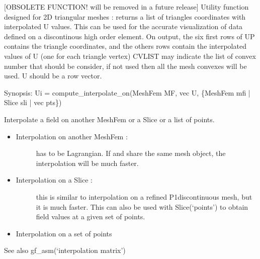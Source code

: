 \documentclass[a4paper,11pt,english]{sphinxmanual}
\begin{document}
\begin{fulllineitems}
\label{\detokenize{python/cmdref_Module compute:getfem.compute_eval_on_triangulated_surface}}
{[}OBSOLETE FUNCTION! will be removed in a future release{]}
Utility function designed for 2D triangular meshes : returns a list
of triangles coordinates with interpolated U values. This can be
used for the accurate visualization of data defined on a
discontinous high order element. On output, the six first rows of UP
contains the triangle coordinates, and the others rows contain the
interpolated values of U (one for each triangle vertex) CVLIST may
indicate the list of convex number that should be consider, if not
used then all the mesh convexes will be used. U should be a row
vector.

\end{fulllineitems}


\begin{fulllineitems}
\label{\detokenize{python/cmdref_Module compute:getfem.compute_interpolate_on}}
Synopsis: Ui = compute\_interpolate\_on(MeshFem MF, vec U, \{MeshFem mfi | Slice sli | vec pts\})

Interpolate a field on another MeshFem or a Slice or a list of points.
\begin{itemize}
\item {} \begin{description}
\item[{Interpolation on another MeshFem :}] \leavevmode
{} has to be Lagrangian. If  and  share the same
mesh object, the interpolation will be much faster.

\end{description}

\item {} \begin{description}
\item[{Interpolation on a Slice :}] \leavevmode
this is similar to interpolation on a refined P1\sphinxhyphen{}discontinuous
mesh, but it is much faster. This can also be used with
Slice(‘points’) to obtain field values at a given set of
points.

\end{description}

\item {} 
Interpolation on a set of points 

\end{itemize}

See also gf\_asm(‘interpolation matrix’)

\end{fulllineitems}
\end{document}
